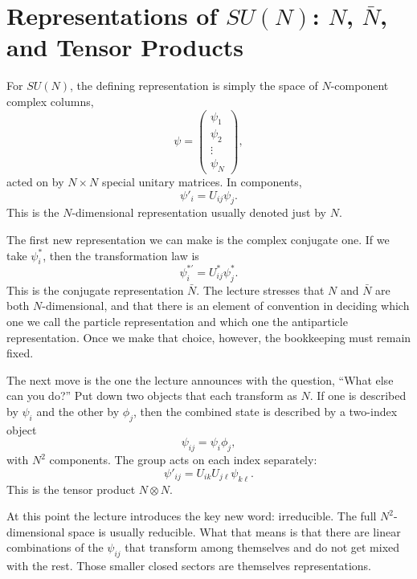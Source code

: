 \section{Representations of \(SU(N)\): \(N\), \(\bar N\), and Tensor Products}

For \(SU(N)\), the defining representation is simply the space of \(N\)-component complex columns,
\begin{equation}
\psi=
\begin{pmatrix}
\psi_1\\
\psi_2\\
\vdots\\
\psi_N
\end{pmatrix},
\end{equation}
acted on by \(N\times N\) special unitary matrices. In components,
\begin{equation}
\psi'_i=U_{ij}\psi_j.
\end{equation}
This is the \(N\)-dimensional representation usually denoted just by \(N\).

The first new representation we can make is the complex conjugate one. If we take \(\psi_i^*\), then the transformation law is
\begin{equation}
\psi_i^{*\prime}=U_{ij}^*\psi_j^*.
\end{equation}
This is the conjugate representation \(\bar N\). The lecture stresses that \(N\) and \(\bar N\) are both \(N\)-dimensional, and that there is an element of convention in deciding which one we call the particle representation and which one the antiparticle representation. Once we make that choice, however, the bookkeeping must remain fixed.

The next move is the one the lecture announces with the question, ``What else can you do?'' Put down two objects that each transform as \(N\). If one is described by \(\psi_i\) and the other by \(\phi_j\), then the combined state is described by a two-index object
\begin{equation}
\psi_{ij}=\psi_i\phi_j,
\end{equation}
with \(N^2\) components. The group acts on each index separately:
\begin{equation}
\psi'_{ij}=U_{ik}U_{j\ell}\psi_{k\ell}.
\end{equation}
This is the tensor product \(N\otimes N\).

At this point the lecture introduces the key new word: irreducible. The full \(N^2\)-dimensional space is usually reducible. What that means is that there are linear combinations of the \(\psi_{ij}\) that transform among themselves and do not get mixed with the rest. Those smaller closed sectors are themselves representations.

